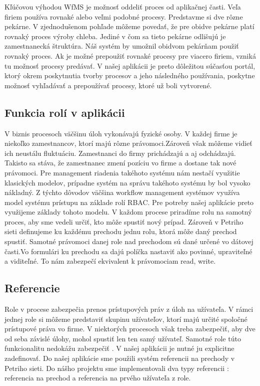 Kľúčovou výhodou WfMS je možnosť oddeliť proces od aplikačnej časti. Veľa firiem používa rovnaké alebo veľmi podobné procesy. Predstavme si dve rôzne pekárne. V zjednodušenom pohľade môžeme povedať, že pre obidve pekárne platí rovnaký proces výroby chleba. Jediné v čom sa tieto pekárne odlišujú je zamestnanecká štruktúra. Náš systém by umožnil obidvom pekárňam použiť rovnaký proces. Ak je možné prepoužiť rovnaké procesy pre viacero firiem, vzniká tu možnosť procesy predávať. V našej aplikácii je preto dôležitou súčasťou portál, ktorý okrem poskytnutia tvorby procesov a jeho následného používania, poskytne možnosť vyhľadávať a prepoužívať procesy, ktoré už boli vytvorené.  


\subsection{Funkcia rolí v aplikácii}
V biznis procesoch väčšinu úloh vykonávajú fyzické osoby. V každej firme je niekoľko zamestnancov, ktorí majú rôzne právomoci.Zároveň však môžeme vidieť ich neustálu fluktuáciu. Zamestnanci do firmy prichádzajú a aj odchádzajú. Takisto sa stáva, že zamestnanec zmení pozíciu vo firme a dostane tak nové právomoci. Pre management riadenia takéhoto systému nám nestačí využitie klasických modelov, prípadne systém na správu takéhoto systému by bol vysoko nákladný. Z týchto dôvodov väčšina workflow management systémov využíva model systému prístupu na základe rolí RBAC. Pre potreby našej aplikácie preto využijeme základy tohoto modelu. V každom procese priradíme rolu na samotný proces, aby sme vedeli určiť, kto môže spustiť nový prípad. Zároveň v Petriho sieti definujeme ku každému prechodu jednu rolu, ktorá môže daný prechod spustiť. Samotné právomoci danej role nad prechodom sú dané určené vo dátovej časti.Vo formulári ku prechodu sa dajú políčka nastaviť ako povinné, upraviteľné a viditeľné. To nám zabezpečí ekvivalent k právomociam read, write. 

\subsection{Referencie}
Role v procese zabezpečia prenos prístupových práv z úloh na užívateľa. V rámci jednej role si môžeme predstaviť skupinu užívateľov, ktorí majú určité spoločné prístupové práva vo firme. V niektorých procesoch však treba zabezpečiť, aby dve od seba závislé úlohy, mohol spustiť len ten samý užívateľ. Samotné role túto funkcionalitu nedokážu zabezpečiť . V našej aplikácii je nutné ju explicitne zadefinovať. Do našej aplikácie sme použili systém referencii na prechody v Petriho sieti. Do nášho projektu sme implementovali dva typy referencii : referencia na prechod a referencia na prvého užívateľa z role. 


